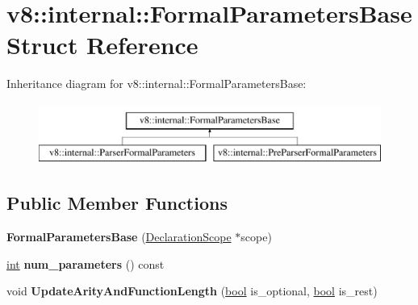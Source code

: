\hypertarget{structv8_1_1internal_1_1FormalParametersBase}{}\section{v8\+:\+:internal\+:\+:Formal\+Parameters\+Base Struct Reference}
\label{structv8_1_1internal_1_1FormalParametersBase}
Inheritance diagram for v8\+:\+:internal\+:\+:Formal\+Parameters\+Base\+:\begin{figure}[H]
\begin{center}
\leavevmode
\includegraphics[height=2.000000cm]{structv8_1_1internal_1_1FormalParametersBase}
\end{center}
\end{figure}
\subsection*{Public Member Functions}
\begin{DoxyCompactItemize}
\item 
\mbox{\label{structv8_1_1internal_1_1FormalParametersBase_a2403ef9f45c08b03ebb42054841645d6}} 
{\bfseries Formal\+Parameters\+Base} (\mbox{\hyperlink{classv8_1_1internal_1_1DeclarationScope}{Declaration\+Scope}} $\ast$scope)
\item 
\mbox{\label{structv8_1_1internal_1_1FormalParametersBase_a8d5115d82bad7244b38407e7bdd59651}} 
\mbox{\hyperlink{classint}{int}} {\bfseries num\+\_\+parameters} () const
\item 
\mbox{\label{structv8_1_1internal_1_1FormalParametersBase_a866475e0b96020fd5e8c36e662f426ff}} 
void {\bfseries Update\+Arity\+And\+Function\+Length} (\mbox{\hyperlink{classbool}{bool}} is\+\_\+optional, \mbox{\hyperlink{classbool}{bool}} is\+\_\+rest)
\end{DoxyCompactItemize}
